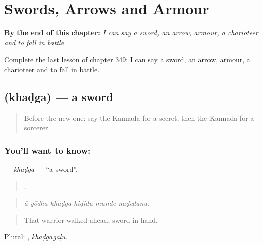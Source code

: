 
\chapter{Swords, Arrows and Armour}
\label{ch:ka-swords-arrows-and-armour}

\begin{chapteropening}
\textbf{By the end of this chapter:} \emph{I can say a sword, an arrow, armour, a charioteer and to fall in battle.}

Complete the last lesson of chapter 349: I can say a sword, an arrow, armour, a charioteer and to fall in battle.
\end{chapteropening}

\section[\texorpdfstring{\kn{ಖಡ್ಗ} (khaḍga)}{ಖಡ್ಗ (khaḍga)}]{ (khaḍga) — a sword}

\label{lesson:KA-C349-khadga}



\begin{quote}
Before the new one: say the Kannada for a secret, then the Kannada for a sorcerer.
\end{quote}

\subsection*{You'll want to know: }
\textbf{} — \emph{khaḍga} — \textquotedblleft{}a sword\textquotedblright{}.

\begin{quote}
     .
\end{quote}

\begin{quote}
\emph{ā yōdha khaḍga hiḍidu munde naḍedanu.}
\end{quote}

\begin{quote}
That warrior walked ahead, sword in hand.
\end{quote}

Plural: , \emph{khaḍgagaḷu}.

